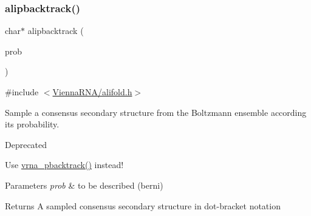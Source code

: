 \subsubsection{\texorpdfstring{alipbacktrack()}{alipbacktrack()}}
{\footnotesize\ttfamily char$\ast$ alipbacktrack (\begin{DoxyParamCaption}\item[{double $\ast$}]{prob }\end{DoxyParamCaption})}



{\ttfamily \#include $<$\mbox{\hyperlink{alifold_8h}{Vienna\+R\+N\+A/alifold.\+h}}$>$}



Sample a consensus secondary structure from the Boltzmann ensemble according its probability. 

\begin{DoxyRefDesc}{Deprecated}
\item[\mbox{\hyperlink{deprecated__deprecated000023}{Deprecated}}]Use \mbox{\hyperlink{group__subopt__stochbt_ga901fe42a33b07be083421741bf7dc610}{vrna\+\_\+pbacktrack()}} instead!\end{DoxyRefDesc}



\begin{DoxyParams}{Parameters}
{\em prob} & to be described (berni) \\
\hline
\end{DoxyParams}
\begin{DoxyReturn}{Returns}
A sampled consensus secondary structure in dot-\/bracket notation 
\end{DoxyReturn}
